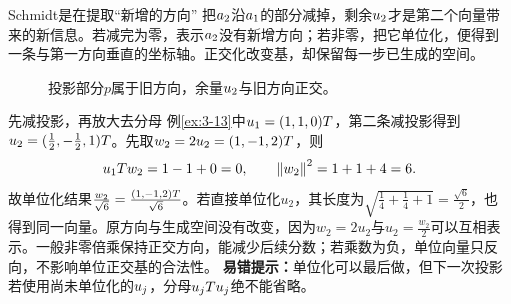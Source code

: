 \begin{insight}{Schmidt是在提取“新增的方向”}
把$a_2$沿$a_1$的部分减掉，剩余$u_2$才是第二个向量带来的新信息。若减完为零，表示$a_2$没有新增方向；若非零，把它单位化，便得到一条与第一方向垂直的坐标轴。正交化改变基，却保留每一步已生成的空间。
\end{insight}
\begin{figure}[H]\centering
{}
\caption{投影部分$p$属于旧方向，余量$u_2$与旧方向正交。}\label{fig:gs-geometry}
\end{figure}
\begin{clevertrick}{先减投影，再放大去分母}
例\ref{ex:3-13}中$u_1=(1,1,0)T$，第二条减投影得到$u_2=(\frac{1}{2},-\frac{1}{2},1)T$。先取$w_2=2u_2=(1,-1,2)T$，则
\[u_1T w_2=1-1+0=0,\qquad\left\lVert w_2\right\rVert^2=1+1+4=6.\]
故单位化结果$\frac{w_2}{\sqrt6}=\frac{(1,-1,2)T}{\sqrt6}$。若直接单位化$u_2$，其长度为$\sqrt{\frac{1}{4}+\frac{1}{4}+1}=\frac{\sqrt6}{2}$，也得到同一向量。原方向与生成空间没有改变，因为$w_2=2u_2$与$u_2=\frac{w_2}{2}$可以互相表示。一般非零倍乘保持正交方向，能减少后续分数；若乘数为负，单位向量只反向，不影响单位正交基的合法性。
\textbf{易错提示：}单位化可以最后做，但下一次投影若使用尚未单位化的$u_j$，分母$u_jTu_j$绝不能省略。
\end{clevertrick}
